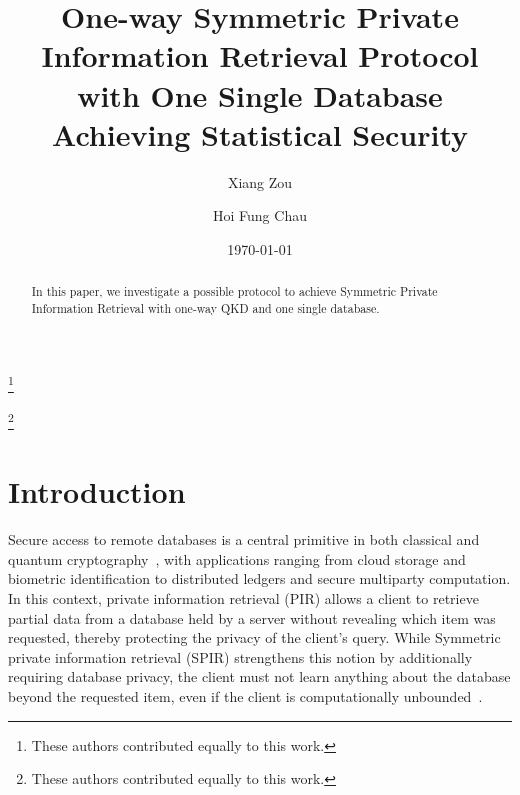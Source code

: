 \documentclass[%
 reprint,
superscriptaddress,
 amsmath,amssymb,
 aps,
]{revtex4-2}
\begin{document}

\title{One-way Symmetric Private Information Retrieval Protocol with One Single Database Achieving Statistical Security}%

\author{Xiang Zou}
\thanks{These authors contributed equally to this work.}
%

\author{Hoi Fung Chau}
\thanks{These authors contributed equally to this work.}
%



\date{\today}%

\begin{abstract}
In this paper, we investigate a possible protocol to achieve Symmetric Private Information Retrieval with one-way QKD and one single database.
\end{abstract}

\maketitle


\section{Introduction}

Secure access to remote databases is a central primitive in both classical and quantum cryptography~\cite{QPQ1, QPQ2, QPQ3, QSPIR_multiple_database1, QSPIR_multiple_database2, Insecurity_Quantum_Oblivious_transfer1}, with applications ranging from cloud storage and biometric identification to distributed ledgers and secure multiparty computation. In this context, private information retrieval (PIR) allows a client to retrieve partial data from a database held by a server without revealing which item was requested, thereby protecting the privacy of the client’s query. While Symmetric private information retrieval (SPIR) strengthens this notion by additionally requiring database privacy, the client must not learn anything about the database beyond the requested item, even if the client is computationally unbounded~\cite{QSPIR_theory1, QSPIR_multiple_database1, QSPIR_multiple_database2, SPIR1, SPIR2, SPIR3}.
\end{document}
